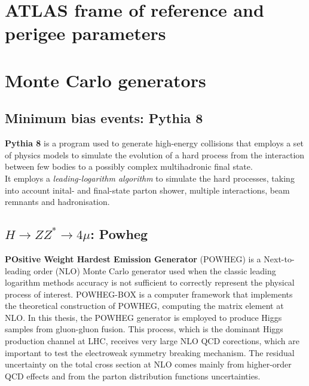 \documentclass[a4paper,twoside,12pt]{article}
\begin{document}
\begin{appendices}
\section{ATLAS frame of reference and perigee parameters} \label{appendix:perigee}

\section{Monte Carlo generators}\label{appendix:MC}
\subsection{Minimum bias events: Pythia 8}
\textbf{Pythia 8} is a program used to generate high-energy collisions that employs a set of physics
models to simulate the evolution of a hard process from the interaction between few bodies 
to a possibly complex multihadronic final state\cite{Pythia8}. 	\\
It employs a \textit{leading-logarithm algorithm} to simulate the hard processes, 
taking into account inital- and final-state parton shower, multiple interactions, beam remnants
and hadronisation. 

\subsection{$H \rightarrow ZZ^* \rightarrow 4\mu$: Powheg}
\textbf{POsitive Weight Hardest Emission Generator} (POWHEG) is a Next-to-leading order (NLO) Monte Carlo generator
used when the classic leading logarithm methods accuracy is not sufficient to correctly 
represent the physical process of interest. POWHEG-BOX is a computer framework 
that implements the theoretical construction of POWHEG, computing the matrix element 
at NLO\cite{Powheg}. In this thesis, the POWHEG generator is employed to produce
Higgs samples from gluon-gluon fusion. This process, which is the dominant Higgs production 
channel at LHC, receives very large NLO QCD corections, which are important to test the 
electroweak symmetry breaking mechanism\cite{Powheg_ggH}. The residual uncertainty 
on the total cross section 
at NLO comes mainly from higher-order QCD effects and from the parton distribution
functions uncertainties.

\newpage
\end{appendices}

\baselineskip 25pt
\baselineskip 5pt
\baselineskip 16pt

\appendix




\end{document}
